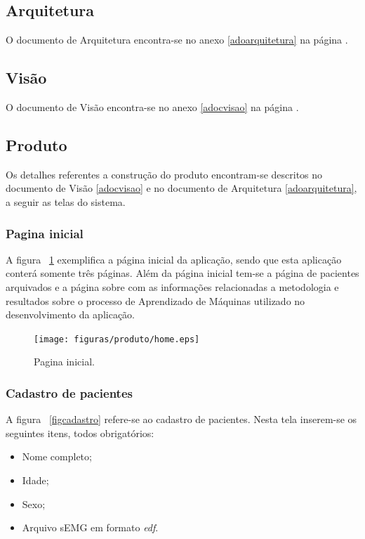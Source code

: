 \subsection{Arquitetura}
O documento de Arquitetura encontra-se no anexo \ref{adoarquitetura} na página \pageref{adoarquitetura}.

\subsection{Visão}
O documento de Visão encontra-se no anexo \ref{adocvisao} na página \pageref{adocvisao}.

\subsection{Produto}
Os detalhes referentes a construção do produto encontram-se descritos no documento de Visão \ref{adocvisao} e no documento de Arquitetura \ref{adoarquitetura}, a seguir as telas do sistema.


\subsubsection{Pagina inicial}
A figura ~\ref{fighome} exemplifica a página inicial da aplicação, sendo que esta aplicação  conterá somente três páginas. Além da página inicial tem-se a página de pacientes arquivados e a página sobre com as informações relacionadas a metodologia e resultados sobre o processo de Aprendizado de Máquinas utilizado no desenvolvimento da aplicação.

\begin{figure}[!htb]
    \centering
    \texttt{[image: figuras/produto/home.eps]}
    \caption{Pagina inicial.}
    \label{fighome}
\end{figure}

\subsubsection{Cadastro de pacientes}
A figura ~\ref{figcadastro} refere-se ao cadastro de pacientes. Nesta tela inserem-se os seguintes itens, todos obrigatórios:
\begin{itemize}
    \item Nome completo;
    \item Idade;
    \item Sexo;
    \item Arquivo sEMG em formato \textit{edf}.
\end{itemize}


